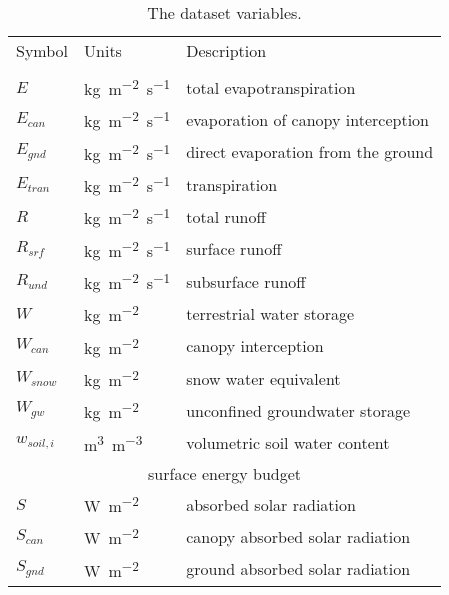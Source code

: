 \begin{table}[t]
    \caption{The dataset variables.}
    \label{tbl:variables}
    \centering
    \begin{tabular}{lll}
        \tophline
        Symbol       & Units                   & Description                                \\
        \middlehline
        \multicolumn{3}{c}{surface water budget}                                            \\
        $E$          & \unit{kg~m^{-2}~s^{-1}} & total evapotranspiration                   \\
        $E_{can}$    & \unit{kg~m^{-2}~s^{-1}} & evaporation of canopy interception         \\
        $E_{gnd}$    & \unit{kg~m^{-2}~s^{-1}} & direct evaporation from the ground         \\
        $E_{tran}$   & \unit{kg~m^{-2}~s^{-1}} & transpiration                              \\
        $R$          & \unit{kg~m^{-2}~s^{-1}} & total runoff                               \\
        $R_{srf}$    & \unit{kg~m^{-2}~s^{-1}} & surface runoff                             \\
        $R_{und}$    & \unit{kg~m^{-2}~s^{-1}} & subsurface runoff                          \\
        $W$          & \unit{kg~m^{-2}}        & terrestrial water storage                  \\
        $W_{can}$    & \unit{kg~m^{-2}}        & canopy interception                        \\
        $W_{snow}$   & \unit{kg~m^{-2}}        & snow water equivalent                      \\
        $W_{gw}$     & \unit{kg~m^{-2}}        & unconfined groundwater storage             \\
        $w_{soil,i}$ & \unit{m^3~m^{-3}}       & volumetric soil water content              \\
        [1mm]
        \multicolumn{3}{c}{surface energy budget}                                           \\
        $S$          & \unit{W~m^{-2}}         & absorbed solar radiation                   \\
        $S_{can}$    & \unit{W~m^{-2}}         & canopy absorbed solar radiation            \\
        $S_{gnd}$    & \unit{W~m^{-2}}         & ground absorbed solar radiation            \\

\end{tabular}
\end{table}
